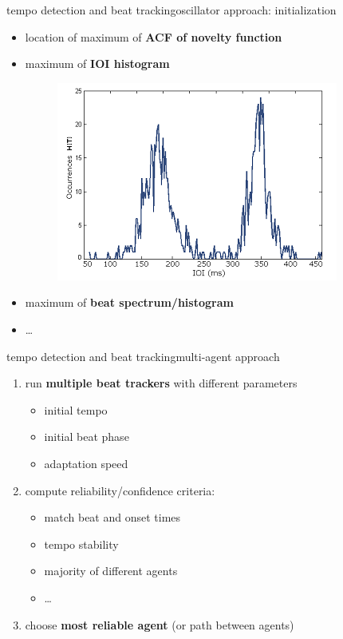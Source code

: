         \begin{frame}{tempo detection and beat tracking}{oscillator approach: initialization}

            \begin{itemize}
                \item	location of maximum of \textbf{ACF of novelty function}
                \item<2->	maximum of \textbf{IOI histogram}
                    \begin{figure}
                        \centering
                            \includegraphics[scale=.3]{graph/ioi_hist}
                    \end{figure}
                \item<3->	maximum of \textbf{beat spectrum/histogram}
                \item<3->	\ldots
            \end{itemize}
        \end{frame}
        \begin{frame}{tempo detection and beat tracking}{multi-agent approach}
            \begin{enumerate}
                \item	run \textbf{multiple beat trackers} with different parameters
                    \begin{itemize}
                        \item	initial tempo
                        \item	initial beat phase
                        \item	adaptation speed
                    \end{itemize}
                \item<2->	compute reliability/confidence criteria:
                
                    \begin{itemize}
                        \item	match beat and onset times
                        \item<3->	tempo stability
                        \item<4->	majority of different agents
                        \item   \ldots
                    \end{itemize}
                \item<5->	choose\textbf{ most reliable agent} (or path between agents)
            \end{enumerate}
        \end{frame}
